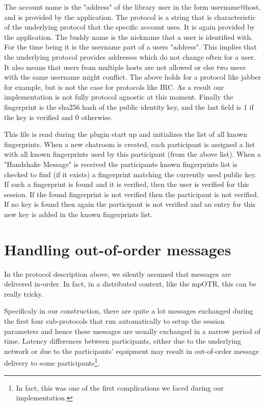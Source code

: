 The account name is the "address" of the library user in the form username@host, and is provided by the application.
The protocol is a string that is characteristic of the underlying protocol that the specific account uses.
It is again provided by the application.
The buddy name is the nickname that a user is identified with.
For the time being it is the username part of a users "address".
This implies that the underlying protocol provides addresses which do not change often for a user.
It also means that users from multiple hosts are not allowed or else two users with the same username might conflict.
The above holds for a protocol like jabber for example, but is not the case for protocols like IRC.
As a result our implementation is not fully protocol agnostic at this moment.
Finally the fingerprint is the sha256 hash of the public identity key, and the last field is 1 if the key is verified and 0 otherwise.

This file is read during the plugin start up and initializes the list of all known fingerprints.
When a new chatroom is created, each participant is assigned a list with all known fingerprints used by this participant (from the above list).
When a "Handshake Message" is received the participants known fingerprints list is checked to find (if it exists) a fingerprint matching the currently used public key.
If such a fingerprint is found and it is verified, then the user is verified for this session.
If the found fingerprint is not verified then the participant is not verified.
If no key is found then again the participant is not verified and an entry for this new key is added in the known fingerprints list. 

\section{Handling out-of-order messages}
In the protocol description above, we silently assumed that messages are delivered in-order. In fact, in a distributed context, like the mpOTR, this can be really tricky.

Specificaly in our construction, there are quite a lot messages exchanged during the first four sub-protocols that run automatically to setup the session parameters and hence these messages are usually exchanged in a narrow period of time. Latency differences between participants, either due to the underlying network or due to the participants' equipment may result in out-of-order message delivery to some participants\footnote{In fact, this was one of the first complications we faced during our implementation.}.

